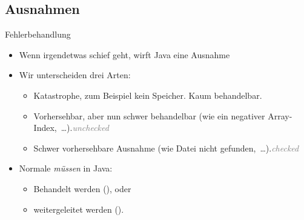 {\subsection{Ausnahmen}
{\def\t#1{\hfill\textcolor{gray}{\itshape#1}}
\begin{frame}{Fehlerbehandlung}
   \begin{itemize}[<+(1)->]
      \itemsep8pt
      \item Wenn irgendetwas schief geht, wirft Java eine Ausnahme
      \item Wir unterscheiden drei Arten: \begin{itemize}
         \item {} Katastrophe, zum Beispiel kein Speicher. Kaum behandelbar.
         \item {} Vorhersehbar, aber nun schwer behandelbar (wie ein negativer Array-Index,~\ldots).\t{unchecked}
         \item {} Schwer vorhersehbare Ausnahme (wie Datei nicht gefunden,~\ldots).\t{checked}
      \end{itemize}
      \item Normale  \emph{müssen} in Java: \begin{itemize}
         \item Behandelt werden (), oder
         \item weitergeleitet werden ().
      \end{itemize}
   \end{itemize}
\end{frame}

}}
